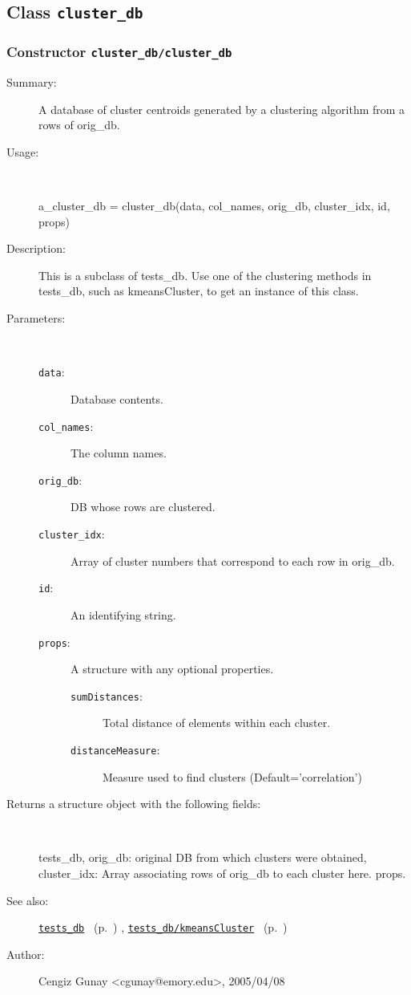 \subsection{Class \texttt{cluster\_db}}%
%
\label{ref_cluster_db}%
\hypertarget{ref_cluster_db}{}%
\subsubsection[Constructor \texttt{cluster\_db}]{Constructor \texttt{cluster\_db/cluster\_db}}%
%
\label{ref_cluster_db__cluster_db}%
\hypertarget{ref_cluster_db__cluster_db}{}%
\begin{description}
\item[Summary:]A database of cluster centroids generated by a clustering algorithm from a rows of orig\_db.
%
\item[Usage:]~%
\begin{lyxcode}%
a\_cluster\_db = cluster\_db(data, col\_names, orig\_db, cluster\_idx, id, props)
%
\end{lyxcode}%
%
\item[Description:]%
This is a subclass of tests\_db. Use one of the clustering methods in 
 tests\_db, such as kmeansCluster, to get an instance of this class.
\item[Parameters:]~
\begin{description}%
\item[\texttt{data}:]
 Database contents.
\item[\texttt{col\_names}:]
 The column names.
\item[\texttt{orig\_db}:]
 DB whose rows are clustered.
\item[\texttt{cluster\_idx}:]
 Array of cluster numbers that correspond to each row in orig\_db.
\item[\texttt{id}:]
 An identifying string.
\item[\texttt{props}:]
 A structure with any optional properties.
\begin{description}%
\item[\texttt{sumDistances}:]
 Total distance of elements within each cluster.
\item[\texttt{distanceMeasure}:]
 Measure used to find clusters (Default='correlation')
\end{description}%
\end{description}%
%
\item[Returns a structure object with the following fields:
]~

	tests\_db, 
	orig\_db: original DB from which clusters were obtained, 
	cluster\_idx: Array associating rows of orig\_db to each cluster here.
	props.
%
%
\item[See also:]%
\hyperlink{ref_tests_db}{\texttt{tests\_db}}%
\ (p.~\pageref{ref_tests_db})%
%
, \hyperlink{ref_tests_db__kmeansCluster}{\texttt{tests\_db/kmeansCluster}}%
\ (p.~\pageref{ref_tests_db__kmeansCluster})%
%
%
\item[Author:]%
Cengiz Gunay <cgunay@emory.edu>, 2005/04/08
%
\end{description}
